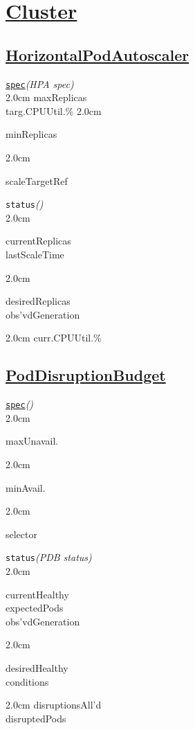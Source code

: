 \section{\href{https://kubernetes.io/docs/concepts/cluster-administration/}{Cluster}}


\subsection*{\href{https://kubernetes.io/docs/tasks/run-application/horizontal-pod-autoscale/}{HorizontalPodAutoscaler}}


\texttt{\href{https://kubernetes.io/docs/reference/kubernetes-api/workload-resources/horizontal-pod-autoscaler-v1/}{spec}}\quad\textit{(HPA spec)}\\[-2mm]
\api
{2.0cm}{
maxReplicas \\
targ.CPUUtil.\%
}
{2.0cm}{
minReplicas

}
{2.0cm}{
scaleTargetRef

}
\stopapi


\texttt{status}\quad\textit{()}\\[-2mm]
\api
{2.0cm}{
currentReplicas \\
lastScaleTime

}
{2.0cm}{
desiredReplicas \\
obs'vdGeneration

}
{2.0cm}{
curr.CPUUtil.\%
}
\stopapi


\subsection*{\href{https://kubernetes.io/docs/tasks/run-application/configure-pdb/}{PodDisruptionBudget}}


\texttt{\href{https://kubernetes.io/docs/reference/kubernetes-api/policy-resources/pod-disruption-budget-v1/}{spec}}\quad\textit{()}\\[-2mm]
\api
{2.0cm}{
maxUnavail.

}
{2.0cm}{
minAvail.

}
{2.0cm}{
selector

}
\stopapi


\texttt{status}\quad\textit{(PDB status)}\\[-2mm]
\api
{2.0cm}{
currentHealthy  \\
expectedPods    \\
obs'vdGeneration

}
{2.0cm}{
desiredHealthy  \\
conditions      

}
{2.0cm}{
disruptionsAll'd\\
disruptedPods   
}
\stopapi


